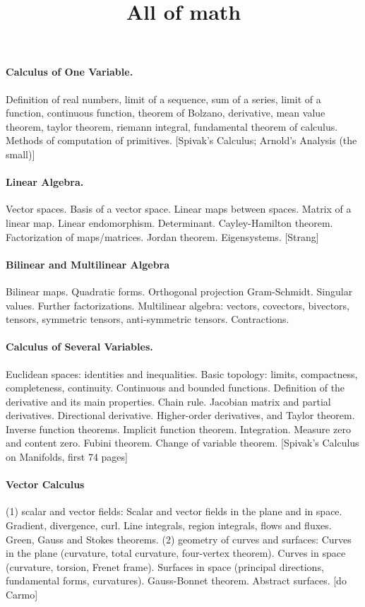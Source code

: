\title{All of math}

\paragraph{Calculus of One Variable.}
Definition of real numbers, limit of a sequence, sum of a series, limit of a
function, continuous function, theorem of Bolzano, derivative, mean value
theorem, taylor theorem, riemann integral, fundamental theorem of calculus.
Methods of computation of primitives.
[Spivak's Calculus; Arnold's Analysis (the small)]

\paragraph{Linear Algebra.}
Vector spaces.  Basis of a vector space.  Linear maps between spaces.  Matrix
of a linear map.  Linear endomorphism.  Determinant.  Cayley-Hamilton
theorem.  Factorization of maps/matrices.  Jordan theorem.  Eigensystems.
[Strang]

\paragraph{Bilinear and Multilinear Algebra}
Bilinear maps.  Quadratic forms.
Orthogonal projection
Gram-Schmidt.
Singular values.  Further factorizations.
Multilinear algebra: vectors, covectors, bivectors, tensors, symmetric
tensors, anti-symmetric tensors.  Contractions.

\paragraph{Calculus of Several Variables.}
Euclidean spaces: identities and inequalities.
Basic topology: limits, compactness, completeness, continuity.
Continuous and bounded functions.
Definition of the derivative and its main properties.
Chain rule.
Jacobian matrix and partial derivatives.
Directional derivative.
Higher-order derivatives, and Taylor theorem.
Inverse function theorems.
Implicit function theorem.
Integration.  Measure zero and content zero.
Fubini theorem.  Change of variable theorem.
[Spivak's Calculus on Manifolds, first 74 pages]


\paragraph{Vector Calculus}
(1) scalar and vector fields:
Scalar and vector fields in the plane and in space.
Gradient, divergence, curl.
Line integrals, region integrals, flows and fluxes.
Green, Gauss and Stokes theorems.
(2) geometry of curves and surfaces:
Curves in the plane (curvature, total curvature, four-vertex theorem).
Curves in space (curvature, torsion, Frenet frame).
Surfaces in space (principal directions, fundamental forms, curvatures).
Gauss-Bonnet theorem.
Abstract surfaces.
[do Carmo]

